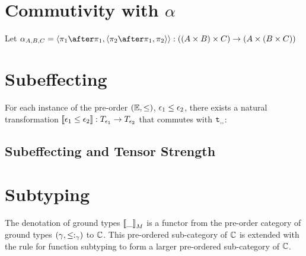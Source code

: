 \documentclass{report}
\begin{document}
\section{Commutivity with $\alpha$}
Let $\alpha_{A, B, C} = \pr{\p\after\p}{\pr{\pp\after\p}{\pp}}: ((A \times B) \times C) \rightarrow (A \times (B \times C))$



\section{Subeffecting}
For each instance of the pre-order $(\mathbb{E}, \leq)$, $\epsilon_1 \leq \epsilon_2$, there exists a natural transformation
${\bf [\![}\epsilon_1 \leq \epsilon_2{\bf ]\!]}: T_{\epsilon_1}{} \rightarrow T_{\epsilon_2}{}$ that commutes with $\texttt{t}_{, , }$:

\subsection{Subeffecting and Tensor Strength}


\section{Subtyping}

The denotation of ground types ${\bf [\![}\_{\bf ]\!]}_M$ is a functor from the pre-order category of ground types $(\gamma, \leq:_{\gamma})$
to $\mathbb{C}$. This pre-ordered sub-category of $\mathbb{C}$ is extended with the rule for function subtyping to form a larger pre-ordered sub-category of $\mathbb{C}$.
\end{document}
